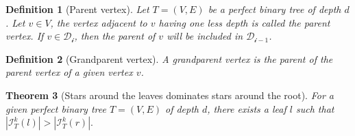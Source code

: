 \documentclass{amsart}
\newtheorem{theorem}{Theorem}[section]
\newtheorem{definition}[theorem]{Definition}
\theoremstyle{definition}
\begin{document}
\begin{definition}[Parent vertex]
	Let $T = (V, E)$ be a perfect binary tree of depth $d$. Let $v \in V$, the vertex adjacent to $v$ having one less depth is called the parent vertex. If $v \in \mathcal{D_i}$, then the parent of $v$ will be included in $\mathcal{D_{i - 1}}$.
\end{definition}

\begin{definition}[Grandparent vertex]
	A grandparent vertex is the parent of the parent vertex of a given vertex $v$.
\end{definition}

\begin{theorem}[Stars around the leaves dominates stars around the root]\label{theorem:leaves_dom_root}
	For a given perfect binary tree $T = (V, E)$	of depth $d$, there exists a leaf $l$ such that $|\mathcal{I}^k_T(l)| > |\mathcal{I}^k_T(r)|.$
\end{theorem}
\end{document}
